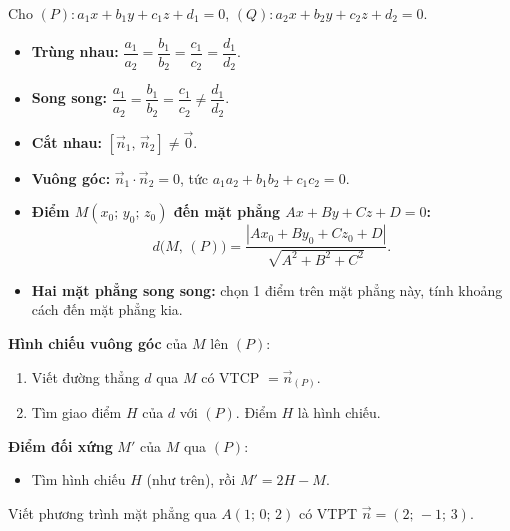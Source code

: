 \documentclass[12pt,a4paper]{article}
\begin{document}
\begin{congthuc}[title={Vị trí tương đối của hai mặt phẳng $(P)$ và $(Q)$}]
  Cho $(P)\!: a_1x + b_1y + c_1z + d_1 = 0$, $(Q)\!: a_2x + b_2y + c_2z + d_2 = 0$.
  \begin{itemize}
    \item \textbf{Trùng nhau:} $\dfrac{a_1}{a_2} = \dfrac{b_1}{b_2} = \dfrac{c_1}{c_2} = \dfrac{d_1}{d_2}$.
    \item \textbf{Song song:} $\dfrac{a_1}{a_2} = \dfrac{b_1}{b_2} = \dfrac{c_1}{c_2} \ne \dfrac{d_1}{d_2}$.
    \item \textbf{Cắt nhau:} $[\vec{n}_1,\, \vec{n}_2] \ne \vec{0}$.
    \item \textbf{Vuông góc:} $\vec{n}_1 \cdot \vec{n}_2 = 0$, tức $a_1 a_2 + b_1 b_2 + c_1 c_2 = 0$.
  \end{itemize}
\end{congthuc}

\begin{congthuc}[title={Khoảng cách}]
  \begin{itemize}
    \item \textbf{Điểm $M(x_0;\, y_0;\, z_0)$ đến mặt phẳng $Ax + By + Cz + D = 0$:}
      \[
        d\bigl(M,\, (P)\bigr) = \frac{|Ax_0 + By_0 + Cz_0 + D|}{\sqrt{A^2 + B^2 + C^2}}.
      \]
    \item \textbf{Hai mặt phẳng song song:} chọn 1 điểm trên mặt phẳng này, tính khoảng cách đến mặt phẳng kia.
  \end{itemize}
\end{congthuc}

\begin{phuongphap}[title={Hình chiếu và đối xứng qua mặt phẳng}]
  \textbf{Hình chiếu vuông góc} của $M$ lên $(P)$:
  \begin{enumerate}
    \item Viết đường thẳng $d$ qua $M$ có VTCP $= \vec{n}_{(P)}$.
    \item Tìm giao điểm $H$ của $d$ với $(P)$. Điểm $H$ là hình chiếu.
  \end{enumerate}
  \textbf{Điểm đối xứng} $M'$ của $M$ qua $(P)$:
  \begin{itemize}
    \item Tìm hình chiếu $H$ (như trên), rồi $M' = 2H - M$.
  \end{itemize}
\end{phuongphap}

\begin{vidu}
  Viết phương trình mặt phẳng qua $A(1;\, 0;\, 2)$ có VTPT $\vec{n} = (2;\, -1;\, 3)$.
\end{vidu}
\end{document}
